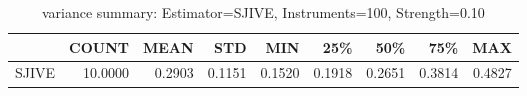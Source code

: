 \begin{table}[ht]
\centering
\caption{variance summary: Estimator=SJIVE, Instruments=100, Strength=0.10}
\begin{tabular}{lrrrrrrrr}
\toprule
 & COUNT & MEAN & STD & MIN & 25\% & 50\% & 75\% & MAX \\
\midrule
SJIVE & 10.0000 & 0.2903 & 0.1151 & 0.1520 & 0.1918 & 0.2651 & 0.3814 & 0.4827 \\
\bottomrule
\end{tabular}
\end{table}
